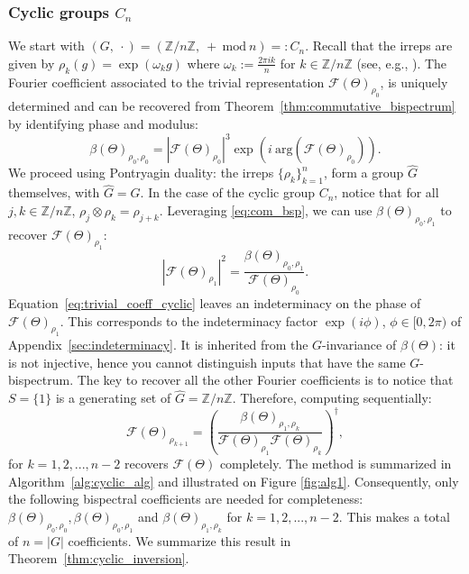 \documentclass{article}
\theoremstyle{plain}
\theoremstyle{definition}
\theoremstyle{remark}
\begin{document}
\subsubsection{Cyclic groups $C_n$}
We start with $(G,\ \cdot)=(\mathbb{Z}/n\mathbb{Z},\ +\ \mathrm{mod}\ n)=:C_n$. Recall that the irreps are given by $\rho_k(g)=\exp\left(\omega_k g\right)$ where $\omega_k:=\frac{2\pi i k }{n}$ for $k\in\mathbb{Z}/n\mathbb{Z}$ (see, e.g., \cite{steinberg2011representation}).
The Fourier coefficient associated to the trivial representation $\mathcal{F}(\Theta)_{\rho_0}$, is uniquely determined and can be recovered from Theorem~\ref{thm:commutative_bispectrum} by identifying phase and modulus:
\begin{equation}\label{eq:trivial_coef}
    \beta(\Theta)_{\rho_0,\rho_0} =|\mathcal{F}(\Theta)_{\rho_0}|^3\exp\left(i\ \mathrm{arg}(\mathcal{F}(\Theta)_{\rho_0})\right).
\end{equation}
We proceed using Pontryagin duality: the irreps $\{\rho_k\}_{k=1}^n$, form a group $\widehat{G}$ themselves, with $\widehat{G} = G$. In the case of the cyclic group $C_n$, notice that for all $j,k\in\mathbb{Z}/n\mathbb{Z}$, $\rho_j\otimes \rho_k = \rho_{j+k}$. Leveraging \eqref{eq:com_bsp}, we can use $\beta(\Theta)_{\rho_0,\rho_1}$ to recover $\mathcal{F}(\Theta)_{\rho_1}$:
\begin{equation}\label{eq:trivial_coeff_cyclic}
    |\mathcal{F}(\Theta)_{\rho_1}|^2 =\frac{\beta(\Theta)_{\rho_0,\rho_1}}{\mathcal{F}(\Theta)_{\rho_0}}.
\end{equation}
Equation~\eqref{eq:trivial_coeff_cyclic} leaves an indeterminacy on the phase of $\mathcal{F}(\Theta)_{\rho_1}$. This corresponds to the indeterminacy factor $\exp(i \phi)$, $\phi\in[0,2\pi)$ of Appendix~\ref{sec:indeterminacy}. It is inherited from the $G$-invariance  of $\beta(\Theta)$: it is not injective, hence you cannot distinguish inputs that have the same $G$-bispectrum. The key to recover all the other Fourier coefficients is to notice that $S = \{1\}$ is a generating set of $\widehat{G} =\mathbb{Z}/n\mathbb{Z}$. Therefore, computing sequentially:
\begin{equation}
    \mathcal{F}(\Theta)_{\rho_{k+1}} = \left(\frac{\beta(\Theta)_{\rho_1,\rho_k}}{\mathcal{F}(\Theta)_{\rho_1}\mathcal{F}(\Theta)_{\rho_k}}\right)^\dagger,
\end{equation}
for $k=1,2,...,n-2$ recovers $\mathcal{F}(\Theta)$ completely. The method is summarized in Algorithm~\ref{alg:cyclic_alg} and illustrated on Figure \ref{fig:alg1}. Consequently, only the following bispectral coefficients are needed for completeness: $\beta(\Theta)_{\rho_0,\rho_0}, \beta(\Theta)_{\rho_0,\rho_1}$ and $ \beta(\Theta)_{\rho_1,\rho_k}$ for $k=1,2,...,n-2$. This makes a total of $n=|G|$ coefficients. We summarize this result in Theorem~\ref{thm:cyclic_inversion}.
\end{document}
